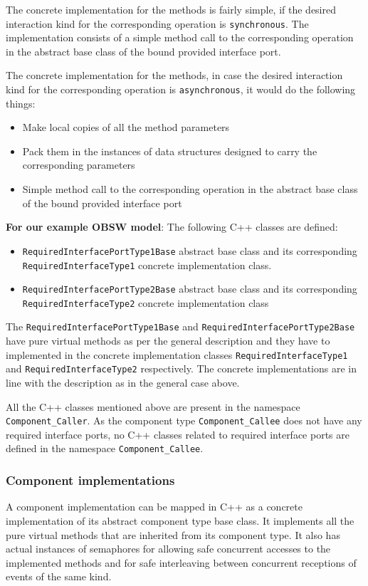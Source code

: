 The concrete implementation for the methods is fairly simple, if the desired interaction kind for the corresponding operation is \texttt{synchronous}. The implementation consists of a simple method call to the corresponding operation in the abstract base class of the bound provided interface port.

The concrete implementation for the methods, in case the desired interaction kind for the corresponding operation is \texttt{asynchronous}, it would do the following things:
\begin{itemize}
\item Make local copies of all the method parameters
\item Pack them in the instances of data structures designed to carry the corresponding parameters
\item Simple method call to the corresponding operation in the abstract base class of the bound provided interface port
\end{itemize}            

\textbf{For our example OBSW model}: The following C++ classes are defined:
\begin{itemize}
\item \texttt{RequiredInterface\allowbreak PortType1Base} abstract base class and its corresponding \texttt{RequiredInterface\allowbreak Type1} concrete implementation class.
\item \texttt{RequiredInterface\allowbreak PortType2Base} abstract base class and its corresponding \texttt{RequiredInterface\allowbreak Type2} concrete implementation class
\end{itemize}

The \texttt{RequiredInterface\allowbreak PortType1Base} and \texttt{RequiredInterface\allowbreak PortType2Base} have pure virtual methods as per the general description and they have to implemented in the concrete implementation classes \texttt{RequiredInterface\allowbreak Type1} and \texttt{RequiredInterface\allowbreak Type2} respectively. The concrete implementations are in line with the description as in the general case above.

All the C++ classes mentioned above are present in the namespace \texttt{Component\allowbreak\_Caller}. As the component type \texttt{Component\allowbreak\_Callee} does not have any required interface ports, no C++ classes related to required interface ports are defined in the namespace \texttt{Component\allowbreak\_Callee}. 

\subsubsection{\textbf{Component implementations}}
A component implementation can be mapped in C++ as a concrete implementation of its abstract component type base class. It implements all the pure virtual methods that are inherited from its component type. It also has actual instances of semaphores for allowing safe concurrent accesses to the implemented methods and for safe interleaving between concurrent receptions of events of the same kind.

